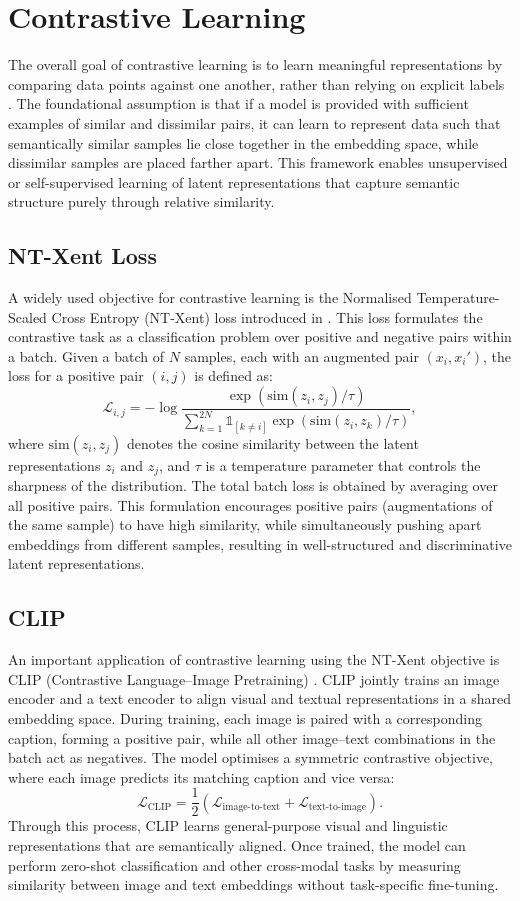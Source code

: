 \section{Contrastive Learning}
\label{sec:contrastive}
The overall goal of contrastive learning is to learn meaningful representations by comparing data points against one another, rather than relying on explicit labels \cite{}. The foundational assumption is that if a model is provided with sufficient examples of similar and dissimilar pairs, it can learn to represent data such that semantically similar samples lie close together in the embedding space, while dissimilar samples are placed farther apart. This framework enables unsupervised or self-supervised learning of latent representations that capture semantic structure purely through relative similarity.

\subsection{NT-Xent Loss}
\label{sec:nxtne_loss}
A widely used objective for contrastive learning is the Normalised Temperature-Scaled Cross Entropy (NT-Xent) loss introduced in \cite{}. This loss formulates the contrastive task as a classification problem over positive and negative pairs within a batch.  
Given a batch of $N$ samples, each with an augmented pair $(x_i, x_i')$, the loss for a positive pair $(i, j)$ is defined as:
\[
\mathcal{L}_{i,j} = -\log \frac{\exp(\text{sim}(z_i, z_j) / \tau)}{\sum_{k=1}^{2N} \mathbb{1}_{[k \neq i]} \exp(\text{sim}(z_i, z_k) / \tau)},
\]
where $\text{sim}(z_i, z_j)$ denotes the cosine similarity between the latent representations $z_i$ and $z_j$, and $\tau$ is a temperature parameter that controls the sharpness of the distribution. The total batch loss is obtained by averaging over all positive pairs.  
This formulation encourages positive pairs (augmentations of the same sample) to have high similarity, while simultaneously pushing apart embeddings from different samples, resulting in well-structured and discriminative latent representations.

\subsection{CLIP}
An important application of contrastive learning using the NT-Xent objective is CLIP (Contrastive Language–Image Pretraining) \cite{}. CLIP jointly trains an image encoder and a text encoder to align visual and textual representations in a shared embedding space.  
During training, each image is paired with a corresponding caption, forming a positive pair, while all other image–text combinations in the batch act as negatives. The model optimises a symmetric contrastive objective, where each image predicts its matching caption and vice versa:
\[
\mathcal{L}_{\text{CLIP}} = \frac{1}{2}(\mathcal{L}_{\text{image-to-text}} + \mathcal{L}_{\text{text-to-image}}).
\]
Through this process, CLIP learns general-purpose visual and linguistic representations that are semantically aligned. Once trained, the model can perform zero-shot classification and other cross-modal tasks by measuring similarity between image and text embeddings without task-specific fine-tuning.
